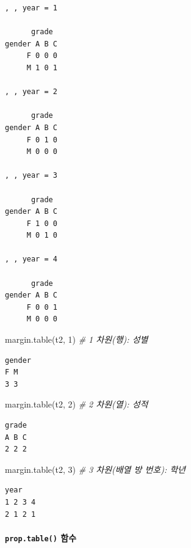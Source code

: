 \documentclass[
  11pt,
]{krantz}
\newenvironment{Shaded}{\begin{snugshade}}{\end{snugshade}}
\newcommand{\CommentTok}[1]{\textcolor[rgb]{0.37,0.37,0.37}{\textit{#1}}}
\newcommand{\DecValTok}[1]{\textcolor[rgb]{0.06,0.06,0.06}{#1}}
\newcommand{\FunctionTok}[1]{\textcolor[rgb]{0,0,0}{#1}}
\newcommand{\NormalTok}[1]{#1}
\begin{document}
\begin{verbatim}
, , year = 1

      grade
gender A B C
     F 0 0 0
     M 1 0 1

, , year = 2

      grade
gender A B C
     F 0 1 0
     M 0 0 0

, , year = 3

      grade
gender A B C
     F 1 0 0
     M 0 1 0

, , year = 4

      grade
gender A B C
     F 0 0 1
     M 0 0 0
\end{verbatim}

\begin{Shaded}
\begin{Highlighting}[]
\FunctionTok{margin.table}\NormalTok{(t2, }\DecValTok{1}\NormalTok{) }\CommentTok{\# 1 차원(행): 성별}
\end{Highlighting}
\end{Shaded}

\begin{verbatim}
gender
F M 
3 3 
\end{verbatim}

\begin{Shaded}
\begin{Highlighting}[]
\FunctionTok{margin.table}\NormalTok{(t2, }\DecValTok{2}\NormalTok{) }\CommentTok{\# 2 차원(열): 성적}
\end{Highlighting}
\end{Shaded}

\begin{verbatim}
grade
A B C 
2 2 2 
\end{verbatim}

\begin{Shaded}
\begin{Highlighting}[]
\FunctionTok{margin.table}\NormalTok{(t2, }\DecValTok{3}\NormalTok{) }\CommentTok{\# 3 차원(배열 방 번호): 학년}
\end{Highlighting}
\end{Shaded}

\begin{verbatim}
year
1 2 3 4 
2 1 2 1 
\end{verbatim}

\normalsize

\hypertarget{table-fun5}{%
\paragraph*{\texorpdfstring{\texttt{prop.table()} 함수}{prop.table() 함수}}\label{table-fun5}}
\end{document}
